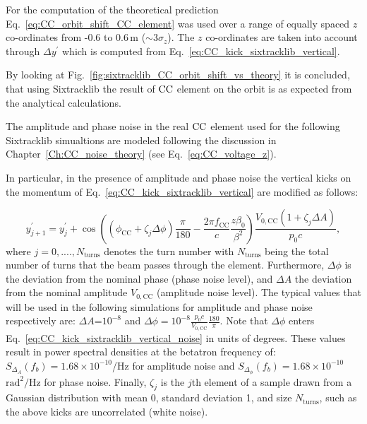 For the computation of the theoretical prediction Eq.~\eqref{eq:CC_orbit_shift_CC_element} was used over a range of equally spaced $z$ co-ordinates from -0.6 to 0.6\,m ($\sim 3 \sigma_z$). The $z$ co-ordinates are taken into account through $\Delta y^\prime$ which is computed from Eq.~\eqref{eq:CC_kick_sixtracklib_vertical}.

By looking at Fig.~\ref{fig:sixtracklib_CC_orbit_shift_vs_theory} it is concluded, that using Sixtracklib the result of ${\mathrm{CC}}$ element on the orbit is as expected from the analytical calculations. %

The amplitude and phase noise in the real ${\mathrm{CC}}$ element used for the following Sixtracklib simualtions are modeled following the discussion in Chapter~\ref{Ch:CC_noise_theory} (see Eq.~\eqref{eq:CC_voltage_z}).

In particular, in the presence of amplitude and phase noise the vertical kicks on the momentum of Eq.~\eqref{eq:CC_kick_sixtracklib_vertical} are modified as follows:

\begin{equation}\label{eq:CC_kick_sixtracklib_vertical_noise}
    y^\prime_{j+1} = y^\prime_{j} + \cos{\left ( (\phi_\mathrm{CC} + \zeta_j \Delta \phi) \frac{\pi}{180} - \frac{2\pi f_\mathrm{CC}}{c} \frac{z \beta_0}{\beta^2} \right )} \frac{V_\mathrm{0,CC} (1 + \zeta_j \Delta A)}{p_0 c},
\end{equation}
where $j={0, ...., N_\mathrm{turns}}$ denotes the turn number with $N_\mathrm{turns}$ being the total number of turns that the beam passes through the element. Furthermore, $\Delta \phi$ is the deviation from the nominal phase (phase noise level), and $\Delta A$ the deviation from the nominal amplitude $V_\mathrm{0,CC}$ (amplitude noise level). The typical values that will be used in the following simulations for amplitude and phase noise respectively are: $\Delta A$=$10^{-8}$ and $\Delta \phi = 10^{-8} \frac{p_0 c}{V_\mathrm{0,CC}} \frac{180}{\pi}$.
Note that $\Delta \phi$ enters Eq.~\eqref{eq:CC_kick_sixtracklib_vertical_noise} in units of degrees.
These values result in power spectral densities at the betatron frequency of: $S_{\Delta_A}(f_b) = 1.68 \times 10^{-10}$/Hz for amplitude noise and $S_{\Delta_\phi}(f_b) = 1.68 \times 10^{-10}$ $\mathrm{rad^2/Hz}$ for phase noise.
Finally, $\zeta_j$ is the $j$th element of a sample drawn from a Gaussian distribution with mean 0, standard deviation 1, and size $N_\mathrm{turns}$, such as the above kicks are uncorrelated (white noise). 



